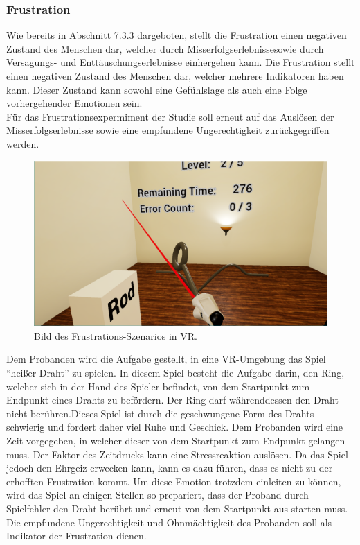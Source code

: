 \subsubsection{Frustration} \label{frust-4}


Wie bereits in Abschnitt 7.3.3 dargeboten, stellt die Frustration einen negativen Zustand des Menschen dar, welcher durch Misserfolgserlebnissesowie durch Versagungs- und Entt{\"a}uschungserlebnisse einhergehen kann. Die Frustration stellt einen negativen Zustand des Menschen dar, welcher mehrere Indikatoren haben kann. Dieser Zustand kann sowohl eine Gef{\"u}hlslage als auch eine Folge vorhergehender Emotionen sein. \\

F{\"u}r das Frustrationsexpermiment der Studie soll erneut auf das Ausl{\"o}sen der Misserfolgserlebnisse sowie eine empfundene Ungerechtigkeit zur{\"u}ckgegriffen werden. \\



\begin{figure}[H] \centering
\includegraphics[width=\textwidth]{Images/frust4.png} 
\caption{ Bild des Frustrations-Szenarios in VR. }
\label{fig:frust4} 
\end{figure}




Dem Probanden wird die Aufgabe gestellt, in eine VR-Umgebung das Spiel ``hei{\ss}er Draht'' zu spielen. In diesem Spiel besteht die Aufgabe darin, den Ring, welcher sich in der Hand des Spieler befindet, von dem Startpunkt zum Endpunkt eines Drahts zu bef{\"o}rdern. Der Ring darf w{\"a}hrenddessen den Draht nicht ber{\"u}hren.Dieses Spiel ist durch die geschwungene Form des Drahts schwierig und fordert daher viel Ruhe und Geschick. Dem Probanden wird eine Zeit vorgegeben, in welcher dieser von dem Startpunkt zum Endpunkt gelangen muss. Der Faktor des Zeitdrucks kann eine Stressreaktion ausl{\"o}sen. Da das Spiel jedoch den Ehrgeiz erwecken kann, kann es dazu f{\"u}hren, dass es nicht zu der erhofften Frustration kommt. Um diese Emotion trotzdem einleiten zu k{\"o}nnen, wird das Spiel an einigen Stellen so prepariert, dass der Proband durch Spielfehler den Draht ber{\"u}hrt und erneut von dem Startpunkt aus starten muss. Die empfundene Ungerechtigkeit und Ohnm{\"a}chtigkeit des Probanden soll als Indikator der Frustration dienen.
